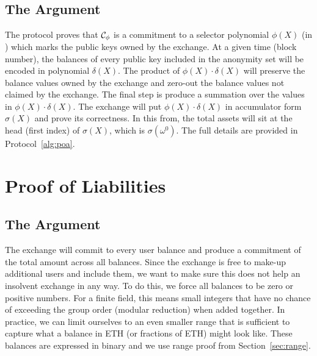 
\subsection{The \poa Argument}


The \bootstrap protocol proves that $\mathcal{C}_\phi$ is a commitment to a selector polynomial $\phi(X)$ (in \bls) which marks the public keys owned by the exchange. At a given time (block number), the balances of every public key included in the anonymity set will be encoded in polynomial $\delta(X)$. The product of $\phi(X)\cdot\delta(X)$ will preserve the balance values owned by the exchange and zero-out the balance values not claimed by the exchange. The final step is produce a summation over the values in $\phi(X)\cdot\delta(X)$. The exchange will put $\phi(X)\cdot\delta(X)$ in accumulator form $\sigma(X)$ and prove its correctness. In this from, the total assets will sit at the head (first index) of $\sigma(X)$, which is $\sigma(\omega^0)$. The full details are provided in Protocol~\ref{alg:poa}.


\section{Proof of Liabilities}

\subsection{The \pol Argument}


The exchange will commit to every user balance and produce a commitment of the total amount across all balances. Since the exchange is free to make-up additional users and include them, we want to make sure this does not help an insolvent exchange in any way. To do this, we force all balances to be zero or positive numbers. For a finite field, this means small integers that have no chance of exceeding the group order (modular reduction) when added together. In practice, we can limit ourselves to an even smaller range that is sufficient to capture what a balance in ETH (or fractions of ETH) might look like. These balances are expressed in binary and we use range proof from Section~\ref{sec:range}.

